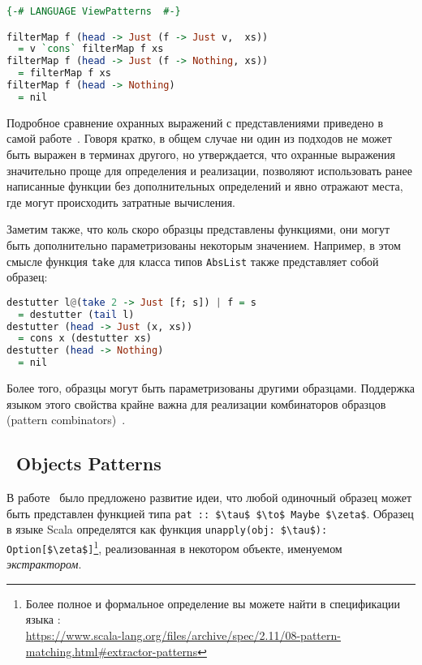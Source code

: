 \noindent
\raggedbottom
\begin{minipage}{\linewidth}
\begin{lstlisting}[language=haskell]
{-# LANGUAGE ViewPatterns  #-}

filterMap f (head -> Just (f -> Just v,  xs))
  = v `cons` filterMap f xs
filterMap f (head -> Just (f -> Nothing, xs)) 
  = filterMap f xs
filterMap f (head -> Nothing)
  = nil
\end{lstlisting}
\end{minipage}

Подробное сравнение охранных выражений с представлениями приведено в самой работе~\cite{erwig2000pattern}. Говоря кратко, в общем случае ни один из подходов не может быть выражен в терминах другого, но утверждается, что охранные выражения значительно проще для определения и реализации, позволяют использовать ранее написанные функции без дополнительных определений и явно отражают места, где могут происходить затратные вычисления.

Заметим также, что коль скоро образцы представлены функциями, они могут быть дополнительно параметризованы некоторым значением. Например, в этом смысле функция \lstinline|take| для класса типов \lstinline|AbsList| также представляет собой образец:

\noindent
\raggedbottom
\begin{minipage}{\linewidth}
\begin{lstlisting}[language=haskell]
destutter l@(take 2 -> Just [f; s]) | f = s 
  = destutter (tail l)
destutter (head -> Just (x, xs)) 
  = cons x (destutter xs)
destutter (head -> Nothing)      
  = nil
\end{lstlisting}
\end{minipage}

Более того, образцы могут быть параметризованы другими образцами. Поддержка языком этого свойства крайне важна для реализации комбинаторов образцов (pattern combinators)~\cite{tullsen2000firstclass}.

\subsection{\Scala~Objects Patterns} \label{sec:scala_objects}
В работе~\cite{emir2007objects} было предложено развитие идеи, что любой одиночный образец может быть представлен функцией типа \lstinline[breaklines]|pat :: $\tau$ $\to$ Maybe $\zeta$|. Образец в языке Scala определятся как функция \lstinline[breaklines]|unapply(obj: $\tau$):| \lstinline[breaklines]|Option[$\zeta$]|\footnote{Более полное и формальное определение вы можете найти в спецификации языка \Scala: \\ \url{https://www.scala-lang.org/files/archive/spec/2.11/08-pattern-matching.html\#extractor-patterns}}, реализованная в некотором объекте, именуемом \textit{экстрактором}. 

